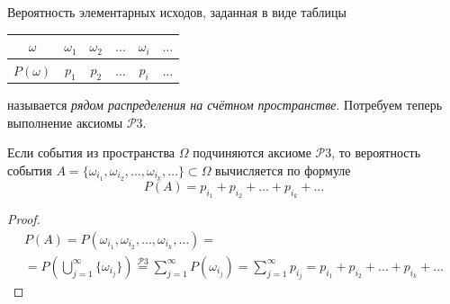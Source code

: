 \begin{definition}
Вероятность элементарных исходов, заданная в виде таблицы
\begin{center}
	\begin{tabular}{|c|c|c|c|c|c|}
		\hline
		$\omega$ & $\omega_1$ & $\omega_2$ & $\ldots$ & $\omega_i$ & $\ldots$ \\ \hline
		$P(\omega)$  & $p_1$ & $p_2$ & $\ldots$  & $p_i$ & $\ldots$ \\ \hline
	\end{tabular}
\end{center}
называется \textit{рядом распределения на счётном пространстве}.
Потребуем теперь выполнение аксиомы $\mathcal{P}3$.
\end{definition}

\begin{lemma}

Если события из пространства $\Omega$ подчиняются аксиоме $\mathcal{P}3$, то вероятность события $A = \{\omega_{i_1} , \omega_{i_2} , \ldots , \omega_{i_k} , \ldots \} \subset \Omega$ вычисляется по формуле
$$P (A) = p_{i_1} + p_{i_2} + \ldots + p_{i_k} + \ldots$$
\end{lemma}

\begin{proof}
\begin{gather*}
	P(A) = P(\omega_{i_1},\omega_{i_2}, \ldots, \omega_{i_k}, \ldots) =\\= P \left( \bigcup_{j=1}^\infty \{ \omega_{i_j}\} \right) \stackrel{\mathcal{P}3}{=} \sum_{j=1}^{\infty} P(\omega_{i_j}) = \sum_{j=1}^{\infty} p_{i_j} = p_{i_1} + p_{i_2} + \ldots + p_{i_k} + \ldots 
\end{gather*}
	
\end{proof}

